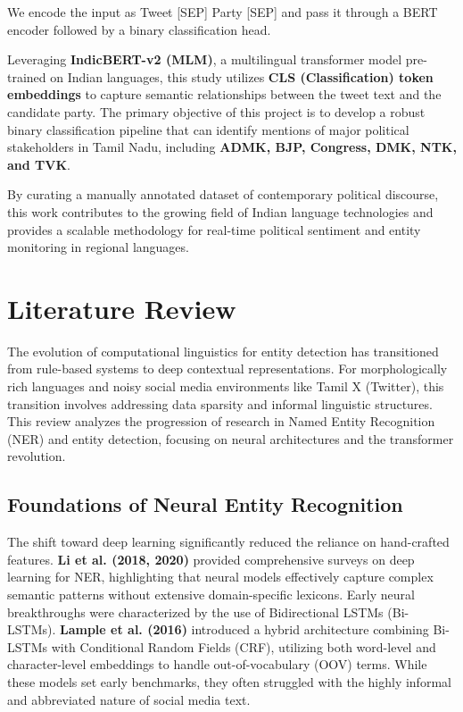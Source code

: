 \documentclass[12pt,a4paper]{article}
\begin{document}
We encode the input as Tweet [SEP] Party [SEP] and pass it through a BERT encoder followed by a binary classification head.

Leveraging \textbf{IndicBERT-v2 (MLM)}, a multilingual transformer model pre-trained on Indian languages, this study utilizes \textbf{CLS (Classification) token embeddings} to capture semantic relationships between the tweet text and the candidate party. The primary objective of this project is to develop a robust binary classification pipeline that can identify mentions of major political stakeholders in Tamil Nadu, including \textbf{ADMK, BJP, Congress, DMK, NTK, and TVK}. 

By curating a manually annotated dataset of contemporary political discourse, this work contributes to the growing field of Indian language technologies and provides a scalable methodology for real-time political sentiment and entity monitoring in regional languages.

\section{Literature Review}
The evolution of computational linguistics for entity detection has transitioned from rule-based systems to deep contextual representations. For morphologically rich languages and noisy social media environments like Tamil X (Twitter), this transition involves addressing data sparsity and informal linguistic structures. This review analyzes the progression of research in Named Entity Recognition (NER) and entity detection, focusing on neural architectures and the transformer revolution.

\subsection{Foundations of Neural Entity Recognition}
The shift toward deep learning significantly reduced the reliance on hand-crafted features. \textbf{Li et al. (2018, 2020)} provided comprehensive surveys on deep learning for NER, highlighting that neural models effectively capture complex semantic patterns without extensive domain-specific lexicons. Early neural breakthroughs were characterized by the use of Bidirectional LSTMs (Bi-LSTMs). \textbf{Lample et al. (2016)} introduced a hybrid architecture combining Bi-LSTMs with Conditional Random Fields (CRF), utilizing both word-level and character-level embeddings to handle out-of-vocabulary (OOV) terms. While these models set early benchmarks, they often struggled with the highly informal and abbreviated nature of social media text.
\end{document}
